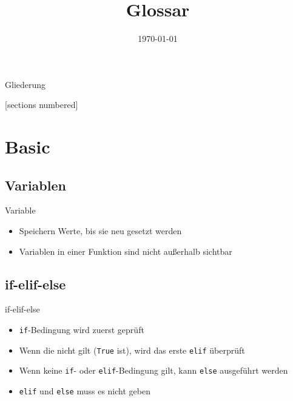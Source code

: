 



\title{Glossar}
\date{\today}
\setlength{\columnsep}{.4cm}



\maketitle

\begin{frame}{Gliederung}
	\begin{multicols}{2}
		[sections numbered]
		\tableofcontents
	\end{multicols}
\end{frame}


\section{Basic}

\subsection{Variablen}
\begin{frame}{Variable}
	
	\begin{itemize}
		\item Speichern Werte, bis sie neu gesetzt werden
		\item Variablen in einer Funktion sind nicht außerhalb sichtbar
	\end{itemize}
\end{frame}

\subsection{if-elif-else}
\begin{frame}{if-elif-else}
	
	\begin{itemize}
		\item \texttt{if}-Bedingung wird zuerst geprüft
		\item Wenn die nicht gilt (\texttt{True} ist), wird das erste \texttt{elif} überprüft
		\item Wenn keine \texttt{if}- oder \texttt{elif}-Bedingung gilt, kann \texttt{else} ausgeführt werden
		\item \texttt{elif} und \texttt{else} muss es nicht geben
	\end{itemize}
\end{frame}

